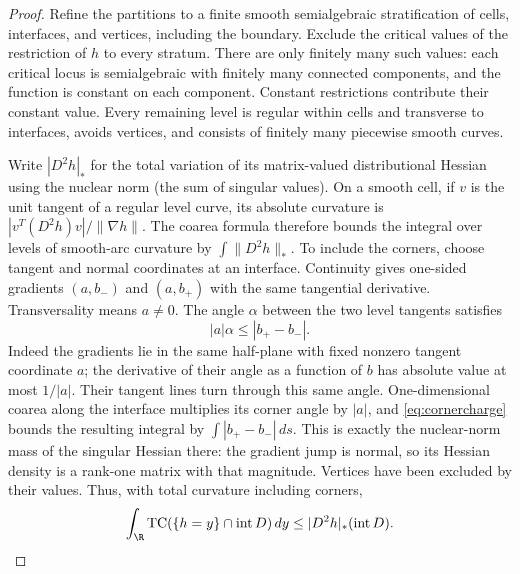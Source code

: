 \begin{proof}
Refine the partitions to a finite smooth semialgebraic stratification of
cells, interfaces, and vertices, including the boundary. Exclude the critical
values of the restriction of $h$ to every stratum. There are only finitely
many such values: each critical locus is semialgebraic with finitely many
connected components, and the function is constant on each component.
Constant restrictions contribute their constant value. Every remaining
level is regular within cells and transverse to interfaces, avoids vertices,
and consists of finitely many piecewise smooth curves.

Write $|D^2h|_*$ for the total variation of its matrix-valued distributional
Hessian using the nuclear norm (the sum of singular values). On a smooth
cell, if $v$ is the unit tangent of a regular level curve, its absolute
curvature is $|v^T(D^2h)v|/\|\nabla h\|$. The coarea formula therefore
bounds the integral over levels of smooth-arc curvature by
$\int\|D^2h\|_*$. To include the corners, choose tangent and normal
coordinates at an interface. Continuity gives one-sided gradients
$(a,b_-)$ and $(a,b_+)$ with the same tangential derivative. Transversality
means $a\ne0$. The angle $\alpha$ between the two level tangents satisfies
\begin{equation}\label{eq:cornercharge}
 |a|\alpha\le|b_+-b_-|.
\end{equation}
Indeed the gradients lie in the same half-plane with fixed nonzero tangent
coordinate $a$; the derivative of their angle as a function of $b$ has
absolute value at most $1/|a|$. Their tangent lines turn through this same
angle. One-dimensional coarea along the interface multiplies its corner
angle by $|a|$, and \eqref{eq:cornercharge} bounds the resulting integral
by $\int|b_+-b_-|\,ds$. This is exactly the nuclear-norm mass of the
singular Hessian there: the gradient jump is normal, so its Hessian density
is a rank-one matrix with that magnitude. Vertices have been excluded by
their values. Thus, with total curvature including corners,
\begin{equation}\label{eq:curvaturecoarea}
 \int_\R\operatorname{TC}(\{h=y\}\cap\operatorname{int}D)\,dy
 \le |D^2h|_*(\operatorname{int}D).
\end{equation}


\end{proof}
